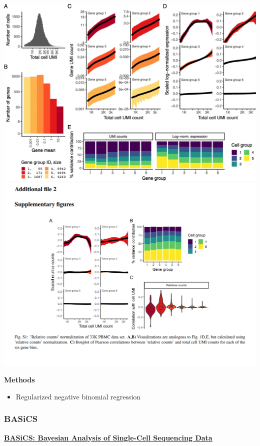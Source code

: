 \documentclass[
]{book}
\providecommand{\tightlist}{%
  \setlength{\itemsep}{0pt}\setlength{\parskip}{0pt}}
\begin{document}
\includegraphics{./figs/RNAseqCounts/sctransform-fig1.png}
\includegraphics{./figs/RNAseqCounts/sctransform-figS1.png}

\textbf{Methods}

\begin{itemize}
\tightlist
\item
  Regularized negative binomial regression
\end{itemize}

\hypertarget{basics}{%
\subsubsection{BASiCS}\label{basics}}

\textbf{\href{https://journals.plos.org/ploscompbiol/article?id=10.1371/journal.pcbi.1004333}{BASiCS: Bayesian Analysis of Single-Cell Sequencing Data}\citep{vallejos2015basics}}
\end{document}
